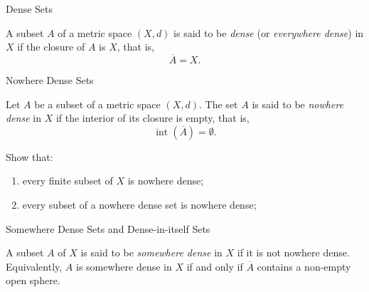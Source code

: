 \documentclass[12pt, a4paper]{article}
\begin{document}
\FrontPage
\Large


\begin{heading}
    Dense Sets
\end{heading}

\vspace{10pt}

\begin{definition}
A subset $A$ of a metric space $(X,d)$ is said to be \emph{dense} (or \emph{everywhere dense})
in $X$ if the closure of $A$ is $X$, that is,
\[
\overline{A}=X.
\]
\end{definition}

\clearpage

\begin{heading}
    Nowhere Dense Sets
\end{heading}

\vspace{10pt}

\begin{definition}
Let $A$ be a subset of a metric space $(X,d)$. The set $A$ is said to be
\emph{nowhere dense} in $X$ if the interior of its closure is empty, that is,
\[
\operatorname{int}(\overline{A})=\emptyset.
\]
\end{definition}

\vspace{10pt}

\begin{problem}
Show that:
\begin{enumerate}
    \item every finite subset of $X$ is nowhere dense;
    \item every subset of a nowhere dense set is nowhere dense;
\end{enumerate}
\end{problem}

\clearpage

\begin{heading}
    Somewhere Dense Sets and Dense-in-itself Sets
\end{heading}

\vspace{10pt}

\begin{definition}
A subset $A$ of $X$ is said to be \emph{somewhere dense} in $X$ if it is not nowhere dense.
Equivalently, $A$ is somewhere dense in $X$ if and only if $\overline{A}$ contains a non-empty
open sphere.
\end{definition}
\end{document}
